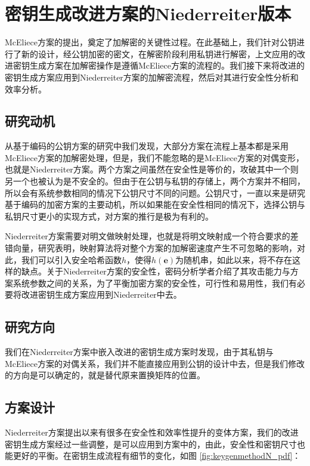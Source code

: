 \chapter{密钥生成改进方案的Niederreiter版本}
McEliece方案的提出，奠定了加解密的关键性过程。在此基础上，我们针对公钥进行了新的设计，经公钥加密的密文，在解密阶段利用私钥进行解密，上文应用的改进密钥生成方案在加解密操作是遵循McEliece方案的流程的。我们接下来将改进的密钥生成方案应用到Niederreiter方案的加解密流程，然后对其进行安全性分析和效率分析。

\section{研究动机}
从基于编码的公钥方案的研究中我们发现，大部分方案在流程上基本都是采用McEliece方案的加解密处理，但是，我们不能忽略的是McEliece方案的对偶变形，也就是Niederreiter方案。两个方案之间虽然在安全性是等价的，攻破其中一个则另一个也被认为是不安全的。但由于在公钥与私钥的存储上，两个方案并不相同，所以会有系统参数相同的情况下公钥尺寸不同的问题。公钥尺寸，一直以来是研究基于编码的加密方案的主要动机，所以如果能在安全性相同的情况下，选择公钥与私钥尺寸更小的实现方式，对方案的推行是极为有利的。

Niederreiter方案需要对明文做映射处理，也就是将明文映射成一个符合要求的差错向量，研究表明，映射算法将对整个方案的加解密速度产生不可忽略的影响，对此，我们可以引入安全哈希函数$h$，使得$h(\mathbf{e})$为随机串，如此以来，将不存在这样的缺点。关于Niederreiter方案的安全性，密码分析学者介绍了其攻击能力与方案系统参数之间的关系，为了平衡加密方案的安全性，可行性和易用性，我们有必要将改进密钥生成方案应用到Niederreiter中去。

\section{研究方向}
我们在Niederreiter方案中嵌入改进的密钥生成方案时发现，由于其私钥与McEliece方案的对偶关系，我们并不能直接应用到公钥的设计中去，但是我们修改的方向是可以确定的，就是替代原来置换矩阵的位置。

\section{方案设计}
Niederreiter方案提出以来有很多在安全性和效率性提升的变体方案，我们的改进密钥生成方案经过一些调整，是可以应用到方案中的，由此，安全性和密钥尺寸也能更好的平衡。在密钥生成流程有细节的变化，如图 \ref{fig:keygenmethodN_pdf}：


